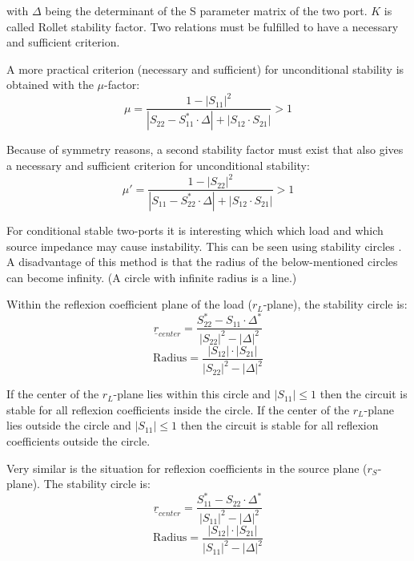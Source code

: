 with $\Delta$ being the determinant of the S parameter matrix of the
two port.  $K$ is called Rollet stability factor.  Two relations must
be fulfilled to have a necessary and sufficient criterion.

\addvspace{12pt}

A more practical criterion (necessary and sufficient) for
unconditional stability is obtained with the $\mu$-factor:
\begin{equation}
\mu = \frac{1-|S_{11}|^2}{|S_{22}-S_{11}^*\cdot \Delta| + |S_{12}\cdot S_{21}|} > 1
\end{equation}

Because of symmetry reasons, a second stability factor must exist that
also gives a necessary and sufficient criterion for unconditional
stability:
\begin{equation}
\mu' = \frac{1-|S_{22}|^2}{|S_{11}-S_{22}^*\cdot \Delta| + |S_{12}\cdot S_{21}|} > 1
\end{equation}

\addvspace{12pt}

For conditional stable two-ports it is interesting which which load
and which source impedance may cause instability.  This can be seen
using stability circles \cite{Michel1}.  A disadvantage of this method
is that the radius of the below-mentioned circles can become infinity.
(A circle with infinite radius is a line.)

\addvspace{12pt}

Within the reflexion coefficient plane of the load ($r_L$-plane), the
stability circle is:
\begin{equation}
\underline{r}_{center} = \frac{S_{22}^* - S_{11}\cdot \Delta^*}{|S_{22}|^2 - |\Delta|^2}
\end{equation}
\begin{equation}
\text{Radius} = \frac{|S_{12}|\cdot |S_{21}|}{|S_{22}|^2 - |\Delta|^2}
\end{equation}

If the center of the $r_L$-plane lies within this circle and $|S_{11}|
\le 1$ then the circuit is stable for all reflexion coefficients
inside the circle.  If the center of the $r_L$-plane lies outside the
circle and $|S_{11}| \le 1$ then the circuit is stable for all
reflexion coefficients outside the circle.

\addvspace{12pt}

Very similar is the situation for reflexion coefficients in the source
plane ($r_S$-plane).  The stability circle is:
\begin{equation}
\underline{r}_{center} = \frac{S_{11}^* - S_{22}\cdot \Delta^*}{|S_{11}|^2 - |\Delta|^2}
\end{equation}
\begin{equation}
\text{Radius} = \frac{|S_{12}|\cdot |S_{21}|}{|S_{11}|^2 - |\Delta|^2}
\end{equation}

